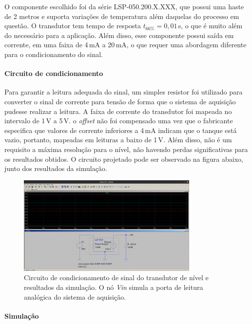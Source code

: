 O componente escolhido foi da série LSP-050.200.X.XXX, que possui uma haste de 2 metros e suporta variações de temperatura além daquelas do processo em questão. O transdutor tem tempo de resposta $t_{66\%} = 0,01$\,s, o que é muito além do necessário para a aplicação. Além disso, esse componente possui saída em corrente, em uma faixa de 4\,mA a 20\,mA, o que requer uma abordagem diferente para o condicionamento do sinal.

\paragraph{Circuito de condicionamento}\mbox{}

Para garantir a leitura adequada do sinal, um simples resistor foi utilizado para converter o sinal de corrente para tensão de forma que o sistema de aquisição pudesse realizar a leitura. A faixa de corrente do transdutor foi mapeada no intervalo de 1\,V a 5\,V. o \emph{offset} não foi compensado uma vez que o fabricante especifica que valores de corrente inferiores a 4\,mA indicam que o tanque está vazio, portanto, mapeadas em leituras a baixo de 1\,V. Além disso, não é um requisito a máxima resolução para o nível, não havendo perdas significativas para os resultados obtidos. O circuito projetado pode ser observado na figura abaixo, junto dos resultados da simulação.

\begin{figure}[H]
    \centering
    \includegraphics[width=0.8\textwidth]{imagens/level_circ.png}
    \caption{Circuito de condicionamento de sinal do transdutor de nível e resultados da simulação. O nó \emph{Vin} simula a porta de leitura analógica do sistema de aquisição.}
    \label{fig:imagens-level_circ-png}
\end{figure}

\paragraph{Simulação}\mbox{}

